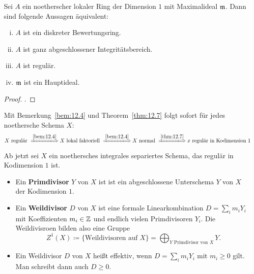 \begin{thm}
\label{thm:12.7}
	Sei $A$ ein noetherscher lokaler Ring der Dimension $1$ mit Maximalideal $\mathfrak{m}$. Dann sind folgende Aussagen äquivalent:
	\begin{enumerate}[i)]
		\item $A$ ist ein diskreter Bewertungsring.
		\item $A$ ist ganz abgeschlossener Integritätsbereich.
		\item $A$ ist regulär.
		\item $\mathfrak{m}$ ist ein Hauptideal.
	\end{enumerate}
	\begin{proof}
		\cite[Proposition~9.2, S.~94]{atiyah1994introduction}.
	\end{proof}
\end{thm}

\begin{bem}
\label{bem:12.8}
	Mit Bemerkung~\ref{bem:12.4} und Theorem~\ref{thm:12.7} folgt sofort für jedes noethersche Schema $X$:
	\[
		X \text{ regulär } \xLongrightarrow{\ref{bem:12.4}} X \text{ lokal faktoriell } \xLongrightarrow{\ref{bem:12.4}} X \text{ normal } \xLongrightarrow{\ref{thm:12.7}} x \text{ regulär in Kodimension } 1
	\]
\end{bem}

Ab jetzt sei $X$ ein noethersches integrales separiertes Schema, das regulär in Kodimension $1$ ist.

\begin{defn}
\label{defn:12.9}
	\begin{itemize}
		\item Ein \textbf{Primdivisor} $Y$ von $X$ ist ist ein abgeschlossene Unterschema $Y$ von $X$ der Kodimension $1$.
		\item Ein \textbf{Weildivisor} $D$ von $X$ ist eine formale Linearkombination $D=\sum_{i}m_iY_i$ mit Koeffizienten $m_i\in \mathbb {Z}$ und endlich vielen Primdivisoren $Y_i$. Die Weildivisroen bilden also eine Gruppe
		\[
			Z^1(X) \coloneqq \{\text{Weildivisoren auf }X\} = \bigoplus_{Y \text{ Primdivisor von }X}Y.
		\]
		\item Ein Weildivisor $D$ von $X$ heißt effektiv, wenn $D = \sum_{i}m_iY_i$ mit $m_i\ge 0$ gilt. Man schreibt dann auch $D \ge 0$.
	\end{itemize}
\end{defn}

